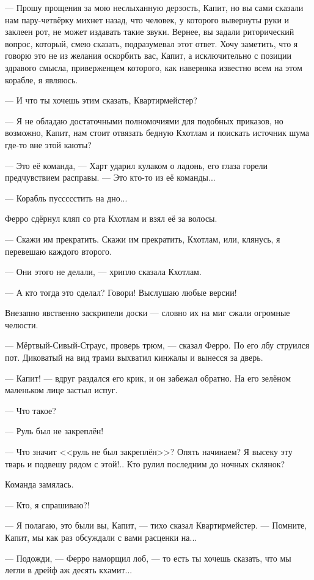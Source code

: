 --- Прошу прощения за мою неслыханную дерзость, Капит, но вы сами сказали нам пару-четвёрку михнет назад, что человек, у которого вывернуты руки и заклеен рот, не может издавать такие звуки.
Вернее, вы задали риторический вопрос, который, смею сказать, подразумевал этот ответ.
Хочу заметить, что я говорю это не из желания оскорбить вас, Капит, а исключительно с позиции здравого смысла, приверженцем которого, как наверняка известно всем на этом корабле, я являюсь.

--- И что ты хочешь этим сказать, Квартирмейстер?

--- Я не обладаю достаточными полномочиями для подобных приказов, но возможно, Капит, нам стоит отвязать бедную Кхотлам и поискать источник шума где-то вне этой каюты?

--- Это её команда, --- Харт ударил кулаком о ладонь, его глаза горели предчувствием расправы.
--- Это кто-то из её команды...

--- Корабль пуссссстить на дно...

Ферро сдёрнул кляп со рта Кхотлам и взял её за волосы.

--- Скажи им прекратить.
Скажи им прекратить, Кхотлам, или, клянусь, я перевешаю каждого второго.

--- Они этого не делали, --- хрипло сказала Кхотлам.

--- А кто тогда это сделал?
Говори!
Выслушаю любые версии!

Внезапно явственно заскрипели доски --- словно их на миг сжали огромные челюсти.

--- Мёртвый-Сивый-Страус, проверь трюм, --- сказал Ферро.
По его лбу струился пот.
Диковатый на вид трами выхватил кинжалы и вынесся за дверь.

--- Капит! --- вдруг раздался его крик, и он забежал обратно.
На его зелёном маленьком лице застыл испуг.

--- Что такое?

--- Руль был не закреплён!

--- Что значит <<руль не был закреплён>>?
Опять начинаем?
Я высеку эту тварь и подвешу рядом с этой!..
Кто рулил последним до ночных склянок?

Команда замялась.

--- Кто, я спрашиваю?!

--- Я полагаю, это были вы, Капит, --- тихо сказал Квартирмейстер.
--- Помните, Капит, мы как раз обсуждали с вами расценки на...

--- Подожди, --- Ферро наморщил лоб, --- то есть ты хочешь сказать, что мы легли в дрейф аж десять кхамит...

